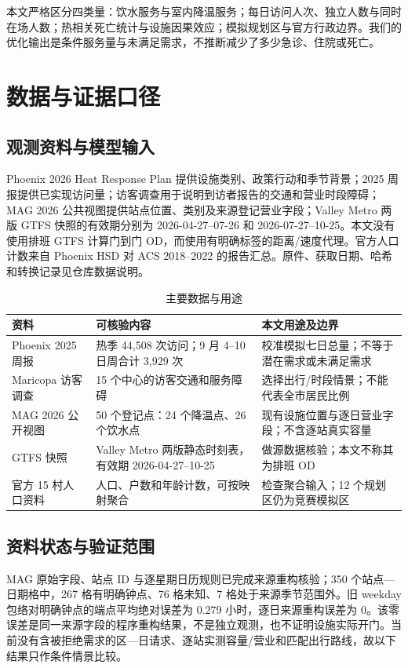 \documentclass[12pt]{article}
\begin{document}
本文严格区分四类量：饮水服务与室内降温服务；每日访问人次、独立人数与同时在场人数；热相关死亡统计与设施因果效应；模拟规划区与官方行政边界。我们的优化输出是条件服务量与未满足需求，不推断减少了多少急诊、住院或死亡。

\section{数据与证据口径}

\subsection{观测资料与模型输入}
Phoenix 2026 Heat Response Plan 提供设施类别、政策行动和季节背景；2025 周报提供已实现访问量；访客调查用于说明到访者报告的交通和营业时段障碍；MAG 2026 公共视图提供站点位置、类别及来源登记营业字段\citep{mag}；Valley Metro 两版 GTFS 快照的有效期分别为 2026-04-27--07-26 和 2026-07-27--10-25\citep{gtfs}。本文没有使用排班 GTFS 计算门到门 OD，而使用有明确标签的距离/速度代理。官方人口计数来自 Phoenix HSD 对 ACS 2018--2022 的报告汇总\citep{acs}。原件、获取日期、哈希和转换记录见仓库数据说明\citep{modelrepo}。

\begin{table}[H]
\centering
\caption{主要数据与用途}
\begin{tabularx}{\textwidth}{p{}p{}X}
\toprule
资料 & 可核验内容 & 本文用途及边界 \\
\midrule
Phoenix 2025 周报 & 热季 44,508 次访问；9 月 4--10 日周合计 3,929 次 & 校准模拟七日总量；不等于潜在需求或未满足需求 \\
Maricopa 访客调查 & 15 个中心的访客交通和服务障碍 & 选择出行/时段情景；不能代表全市居民比例 \\
MAG 2026 公开视图 & 50 个登记点：24 个降温点、26 个饮水点 & 现有设施位置与逐日营业字段；不含逐站真实容量 \\
GTFS 快照 & Valley Metro 两版静态时刻表，有效期 2026-04-27--10-25 & 做源数据核验；本文不称其为排班 OD \\
官方 15 村人口资料 & 人口、户数和年龄计数，可按映射聚合 & 检查聚合输入；12 个规划区仍为竞赛模拟区 \\
\bottomrule
\end{tabularx}
\end{table}

\subsection{资料状态与验证范围}
MAG 原始字段、站点 ID 与逐星期日历规则已完成来源重构核验；350 个站点—日期格中，267 格有明确钟点、76 格未知、7 格处于来源季节范围外。旧 weekday 包络对明确钟点的端点平均绝对误差为 0.279 小时，逐日来源重构误差为 0。该零误差是同一来源字段的程序重构结果，不是独立观测，也不证明设施实际开门。当前没有含被拒绝需求的区—日请求、逐站实测容量/营业和匹配出行路线，故以下结果只作条件情景比较。
\end{document}
